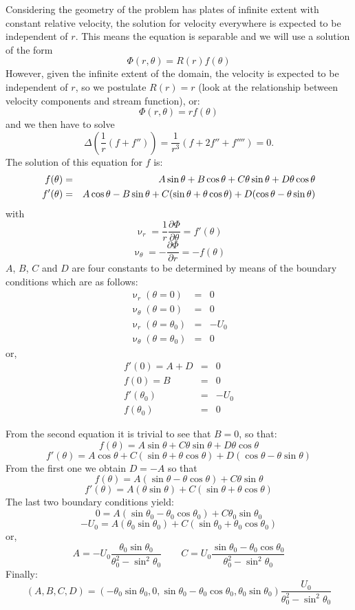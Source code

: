 Considering the geometry of the problem has plates of infinite extent with constant relative
velocity, the solution for velocity everywhere is expected to be independent of $r$. This means the
equation is separable and we will use a solution of the form
\[
\Phi(r,\theta)= R(r) f(\theta)
\]
However, given the infinite extent of the domain, the velocity is expected to be 
independent of $r$, so we postulate $R(r)=r$ (look at the relationship between velocity components and 
stream function), or:
\[
\Phi(r,\theta)= r f(\theta)
\]
and we then have to solve
\[
\Delta \left( \frac{1}{r} (f+f'')\right) = \frac{1}{r^3}(f+2f''+f'''')=0.
\]
The solution of this equation for $f$ is:
\begin{eqnarray}
f(\theta) &=&A \sin\theta + B \cos \theta + C \theta \sin \theta + D \theta \cos \theta   \nonumber\\
f'(\theta)&=&A \cos\theta - B \sin \theta + C (\sin \theta + \theta \cos \theta) + D (\cos \theta - \theta \sin \theta) \nonumber
\end{eqnarray}
with
\[
\upnu_r=\frac{1}{r}\frac{\partial \Phi}{\partial \theta} = f'(\theta)
\]
\[
\upnu_\theta=-\frac{\partial \Phi}{\partial r} = -f(\theta)
\]
$A$, $B$, $C$ and $D$ are four constants to be determined by means of the boundary conditions which 
are as follows:
\begin{eqnarray}
\upnu_r(\theta=0)            &=&  0 \nonumber\\
\upnu_\theta(\theta=0)       &=&  0 \nonumber\\
\upnu_r(\theta=\theta_0)     &=&  -U_0 \nonumber\\
\upnu_\theta(\theta=\theta_0)&=&  0 \nonumber
\end{eqnarray}
or,
\begin{eqnarray}
f'(0)= A+D &=& 0 \\
f(0) = B &=& 0 \\
f'(\theta_0) &=& -U_0 \\
f(\theta_0) &=& 0 
\end{eqnarray}

From the second equation it is trivial to see that $B=0$, so that:
\[
f(\theta)=A \sin\theta + C \theta \sin \theta + D \theta \cos \theta
\]
\[
f'(\theta)=A \cos\theta + C (\sin \theta + \theta \cos \theta) + D (\cos \theta - \theta \sin \theta)
\]
From the first one we obtain $D=-A$ so that 
\[
f(\theta)=A (\sin\theta - \theta \cos \theta)  + C \theta \sin \theta 
\]
\[
f'(\theta)=A ( \theta \sin \theta)    + C (\sin \theta + \theta \cos \theta) 
\]
The last two boundary conditions yield:
\[
0=A (\sin\theta_0 - \theta_0 \cos \theta_0)  + C \theta_0 \sin \theta_0 
\]
\[
-U_0 = A ( \theta_0 \sin \theta_0)    + C (\sin \theta_0 + \theta_0 \cos \theta_0) 
\]
or, 
\[
A= - U_0 \frac{\theta_0 \sin\theta_0}{\theta_0^2-\sin^2\theta_0}
\quad\quad
C=   U_0 \frac{\sin\theta_0 - \theta_0 \cos \theta_0}{\theta_0^2-\sin^2\theta_0}
\]
Finally:
\[
(A,B,C,D)=
(
-\theta_0 \sin\theta_0,
0,
\sin\theta_0 - \theta_0 \cos \theta_0,
\theta_0 \sin\theta_0
)
\frac{U_0}{\theta_0^2-\sin^2\theta_0}
\]


